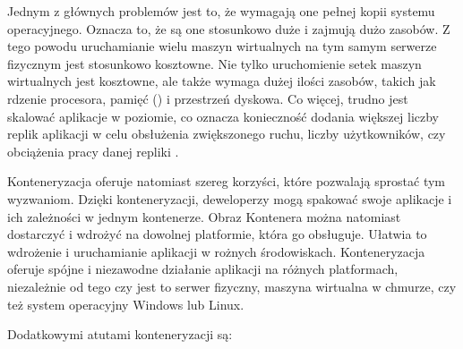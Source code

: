 Jednym z głównych problemów jest to, że wymagają one pełnej kopii systemu operacyjnego. Oznacza to, że są one stosunkowo duże i zajmują dużo zasobów. Z tego powodu uruchamianie wielu maszyn wirtualnych na tym samym serwerze fizycznym jest stosunkowo kosztowne. Nie tylko uruchomienie setek maszyn wirtualnych jest kosztowne, ale także wymaga dużej ilości zasobów, takich jak rdzenie procesora, pamięć  () i przestrzeń dyskowa. Co więcej, trudno jest skalować aplikacje w poziomie, co oznacza konieczność dodania większej liczby replik aplikacji w celu obsłużenia zwiększonego ruchu, liczby użytkowników, czy obciążenia pracy danej repliki \cite{dockerContenerizationKeyAndUseCases}.

Konteneryzacja oferuje natomiast szereg korzyści, które pozwalają sprostać tym wyzwaniom. Dzięki konteneryzacji, deweloperzy mogą spakować swoje aplikacje i ich zależności w jednym kontenerze. Obraz Kontenera można natomiast dostarczyć i wdrożyć na dowolnej platformie, która go obsługuje. Ułatwia to wdrożenie i uruchamianie aplikacji w rożnych środowiskach. Konteneryzacja oferuje spójne i niezawodne działanie aplikacji na różnych platformach, niezależnie od tego czy jest to serwer fizyczny, maszyna wirtualna w chmurze, czy też system operacyjny Windows lub Linux\cite{dockerContenerizationKeyAndUseCases}\cite{dockerOverview}. 

Dodatkowymi atutami konteneryzacji są:

